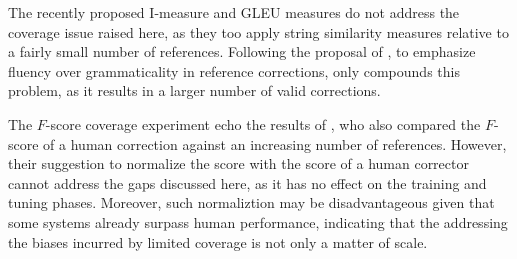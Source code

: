 \documentclass[letterpaper, 11pt]{article}
\newcommand{\lc}[1]{}
\begin{document}
The recently proposed {\sc I-measure} \cite{felice2015towards} and GLEU \cite{napoles2015ground} measures do not address
the coverage issue raised here, as they too apply string similarity measures relative to a fairly small number of references.
Following the proposal of , to emphasize fluency over grammaticality in reference corrections, only compounds this problem, as it results in a larger number of valid corrections.

The $F$-score coverage experiment echo the results of ,
who also compared the $F$-score of a human correction against an increasing number of references.
However, their suggestion to normalize the score
with the score of a human corrector cannot address the gaps discussed here,
as it has no effect on the training and tuning phases.
Moreover, such normaliztion may be disadvantageous given that some systems already surpass human performance,
indicating that the addressing the biases incurred by limited coverage is not only a matter of scale.


\end{document}
